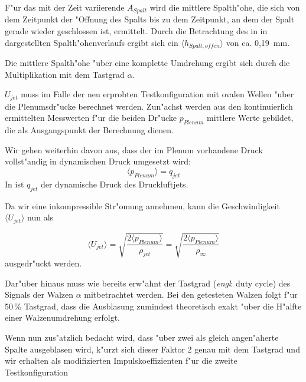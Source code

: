 F"ur das mit der Zeit variierende $A_{Spalt}$   wird die mittlere Spalth"ohe, die sich von dem Zeitpunkt der "Offnung des Spalts bis zu dem Zeitpunkt, an dem der Spalt gerade wieder geschlossen ist, ermittelt.  
Durch die Betrachtung des in  in  dargestellten Spalth"ohenverlaufs ergibt sich ein $\langle{h_{Spalt,offen}}\rangle$ von ca. 0,19 \,mm.

Die mittlere Spalth"ohe "uber eine komplette Umdrehung ergibt sich durch die Multiplikation mit dem Tastgrad $\alpha$.

$U_{jet}$ muss im Falle der neu erprobten Testkonfiguration mit ovalen Wellen "uber die Plenumsdr"ucke berechnet werden.
Zun"achst werden aus den kontinuierlich ermittelten Messwerten f"ur die beiden Dr"ucke $p_{Plenum}$ mittlere Werte gebildet, die als Ausgangspunkt der Berechnung dienen.

Wir gehen weiterhin davon aus, dass der im Plenum vorhandene Druck vollst"andig in dynamischen Druck umgesetzt wird:
	\begin{equation}
	\label{eq:Annahme q}
		\langle{p_{Plenum}}\rangle = q_{jet}
	\end{equation}
In ist $q_{jet}$ der dynamische Druck des Druckluftjets.

Da wir eine inkompressible Str"omung annehmen, kann die Geschwindigkeit $\langle{U_{jet}}\rangle$ nun als
	
	\begin{equation}
	\label{eq:jetgeschwindigkeit}
		\langle{U_{jet}}\rangle = \sqrt{\frac{2 \langle{p_{Plenum}}\rangle}{\rho_{jet}}} = \sqrt{\frac{2 \langle{p_{Plenum}}\rangle}{\rho_{\infty}}}
	\end{equation}
ausgedr"uckt werden.

Dar"uber hinaus muss wie bereits erw"ahnt der Tastgrad (\textit{engl}: duty cycle) des Signals der Walzen $\alpha$  mitbetrachtet werden.
Bei den getesteten Walzen folgt f"ur 50\,\% Tastgrad, dass die Ausblasung zumindest theoretisch exakt "uber die H"alfte einer Walzenumdrehung erfolgt.

Wenn nun zus"atzlich bedacht wird, dass "uber zwei als gleich angen"aherte Spalte ausgeblasen wird, k"urzt sich dieser Faktor 2 genau mit dem Tastgrad und wir erhalten als modifizierten Impulskoeffizienten f"ur die zweite Testkonfiguration

